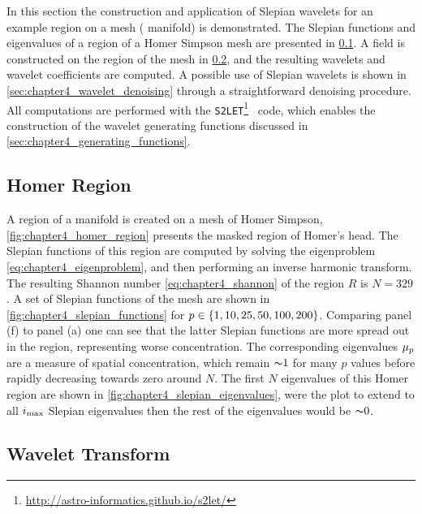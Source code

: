 In this section the construction and application of Slepian wavelets for an example region on a mesh (\cf{} manifold) is demonstrated.
The Slepian functions and eigenvalues of a region of a Homer Simpson mesh are presented in \cref{sec:chapter4_homer_region}.
A field is constructed on the region of the mesh in \cref{sec:chapter4_wavelet_transform}, and the resulting wavelets and wavelet coefficients are computed.
A possible use of Slepian wavelets is shown in \cref{sec:chapter4_wavelet_denoising} through a straightforward denoising procedure.
All computations are performed with the \texttt{S2LET}\footnote{\url{http://astro-informatics.github.io/s2let/}}~\cite{Leistedt2013} code, which enables the construction of the wavelet generating functions discussed in \cref{sec:chapter4_generating_functions}.

\subsection{Homer Region}\label{sec:chapter4_homer_region}

A region of a manifold is created on a mesh of Homer Simpson, \cref{fig:chapter4_homer_region} presents the masked region of Homer's head.
The Slepian functions of this region are computed by solving the eigenproblem \cref{eq:chapter4_eigenproblem}, and then performing an inverse harmonic transform.
The resulting Shannon number \cref{eq:chapter4_shannon} of the region \(R\) is \(N=329\).
A set of Slepian functions of the mesh are shown in \cref{fig:chapter4_slepian_functions} for \(p \in \{1, 10, 25, 50, 100, 200\}\).
Comparing panel (f) to panel (a) one can see that the latter Slepian functions are more spread out in the region, representing worse concentration.
The corresponding eigenvalues \({\mu}_{p}\) are a measure of spatial concentration, which remain \({\thicksim}1\) for many \(p\) values before rapidly decreasing towards zero around \(N\).
The first \(N\) eigenvalues of this Homer region are shown in \cref{fig:chapter4_slepian_eigenvalues}, were the plot to extend to all \(i_{\text{max}}{}\) Slepian eigenvalues then the rest of the eigenvalues would be \({\thicksim}0\).







\subsection{Wavelet Transform}\label{sec:chapter4_wavelet_transform}

